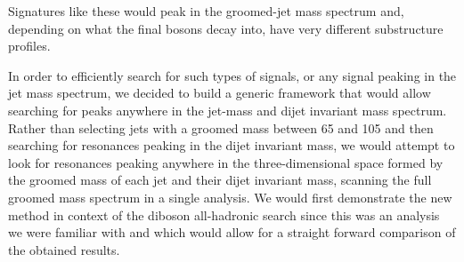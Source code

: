 Signatures like these would peak in the groomed-jet mass spectrum and, depending on what the final bosons decay into, have very different substructure profiles.\par
In order to efficiently search for such types of signals, or any signal peaking in the jet mass spectrum, we decided to build a generic framework that would allow searching for peaks anywhere in the jet-mass and dijet invariant mass spectrum.
Rather than selecting jets with a groomed mass between 65 and 105 \GeV and then searching for resonances peaking in the dijet invariant mass, we would attempt to look for resonances peaking anywhere in the three-dimensional space formed by the groomed mass of each jet and their dijet invariant mass, scanning the full groomed mass spectrum in a single analysis. We would first demonstrate the new method in context of the diboson all-hadronic search since this was an analysis we were familiar with and which would allow for a straight forward comparison of the obtained results. \clearpage

